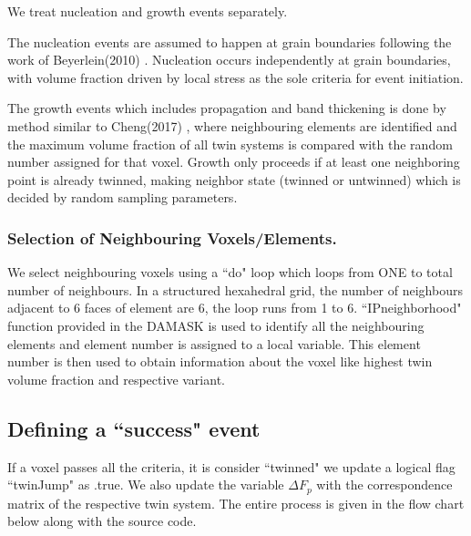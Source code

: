 We treat nucleation and growth events separately.

The nucleation events are assumed to happen at grain boundaries following the work of Beyerlein(2010) \cite{beyerlein2010probabilistic}. Nucleation occurs independently at grain boundaries, with volume fraction driven by local stress as the sole criteria for event initiation.

The growth events which includes propagation and band thickening is done by method similar to Cheng(2017) \cite{CHENG2017512}, where neighbouring elements are identified and the maximum volume fraction of all twin systems is compared with the random number assigned for that voxel. Growth only proceeds if at least one neighboring point is already twinned, making neighbor state (twinned or untwinned) which is decided by random sampling parameters.

\subsubsection{Selection of Neighbouring Voxels/Elements.}
We select neighbouring voxels using a ``do" loop which loops from ONE to total number of neighbours. In a structured hexahedral grid, the number of neighbours adjacent to 6 faces of element are 6, the loop runs from 1 to 6. ``IPneighborhood" function provided in the DAMASK is used to identify all the neighbouring elements and element number is assigned to a local variable. This element number is then used to obtain information about the voxel like highest twin volume fraction and respective variant.

\subsection{Defining a ``success" event}
\label{consequence_of_success}
If a voxel passes all the criteria, it is consider ``twinned" we update a logical flag ``twinJump" as .true. We also update the variable $\Delta F_p$ with the correspondence matrix of the respective twin system. The entire process is given in the flow chart below along with the source code.

